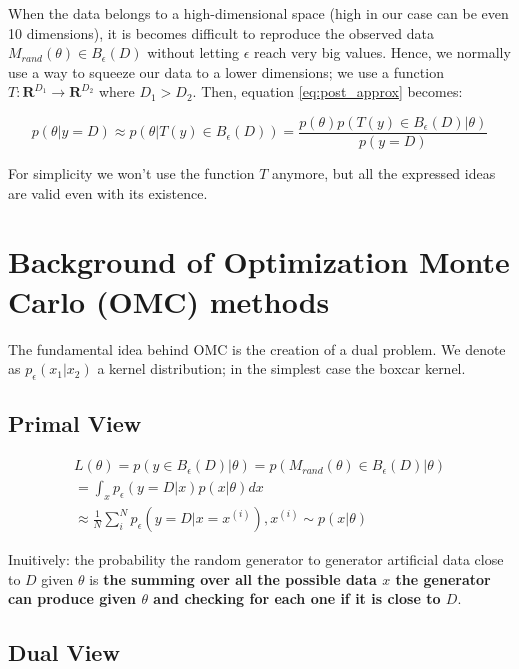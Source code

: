 \documentclass{article}
\begin{document}
When the data belongs to a high-dimensional space (high in our case can be even 10 dimensions), it is becomes difficult to reproduce the observed data $M_{rand}(\theta) \in B_{\epsilon}(D)$ without letting $\epsilon$ reach very big values. Hence, we normally use a way to squeeze our data to a lower dimensions; we use a function $T:\mathbf{R}^{D_1} \rightarrow \mathbf{R}^{D_2}$ where $D_1 > D_2$. Then, equation \ref{eq:post_approx} becomes:

\begin{equation} \label{eq:summary_stat}
    p(\theta|y=D) \approx p(\theta|T(y) \in B_\epsilon(D)) = \frac{p(\theta) p(T(y) \in B_\epsilon(D)|\theta)}{p(y=D)}
\end{equation}

For simplicity we won't use the function $T$ anymore, but all the expressed ideas are valid even with its existence.


\section{Background of Optimization Monte Carlo (OMC) methods}

The fundamental idea behind OMC is the creation of a dual problem. We denote as $p_\epsilon(x_1|x_2)$ a kernel distribution; in the simplest case the boxcar kernel. 

\subsection*{Primal View}

\begin{gather} \label{eq:primal_view}
  L(\theta) = p(y \in B_\epsilon (D)|\theta) = p(M_{rand}(\theta) \in B_\epsilon (D)|\theta)\\
  = \int_x p_\epsilon(y=D|x)p(x|\theta)dx \\
  \approx \frac{1}{N} \sum_i^N p_\epsilon (y=D|x=x^{(i)}), x^{(i)} \sim p(x|\theta)
\end{gather}

Inuitively: the probability the random generator to generator artificial data close to $D$ given $\theta$ is \textbf{the summing over all the possible data $x$ the generator can produce given $\theta$ and checking for each one if it is close to $D$}.

\subsection*{Dual View}
\end{document}
